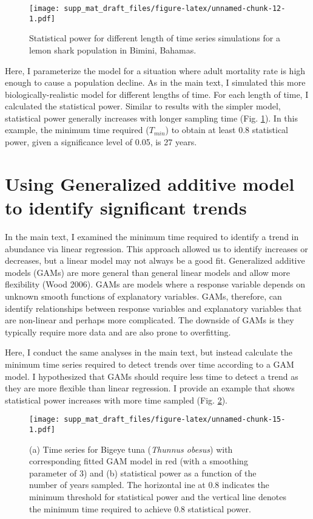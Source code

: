 \documentclass[12pt,]{article}
\begin{document}
\begin{figure}
\centering
\texttt{[image: supp\_mat\_draft\_files/figure-latex/unnamed-chunk-12-1.pdf]}
\caption{Statistical power for different length of time series
simulations for a lemon shark population in Bimini,
Bahamas.\label{fig:shark_example}}
\end{figure}

Here, I parameterize the model for a situation where adult mortality
rate is high enough to cause a population decline. As in the main text,
I simulated this more biologically-realistic model for different lengths
of time. For each length of time, I calculated the statistical power.
Similar to results with the simpler model, statistical power generally
increases with longer sampling time (Fig. \ref{fig:shark_example}). In
this example, the minimum time required (\(T_{min}\)) to obtain at least
0.8 statistical power, given a significance level of 0.05, is 27 years.

\pagebreak

\section{Using Generalized additive model to identify significant
trends}\label{using-generalized-additive-model-to-identify-significant-trends}

In the main text, I examined the minimum time required to identify a
trend in abundance via linear regression. This approach allowed us to
identify increases or decreases, but a linear model may not always be a
good fit. Generalized additive models (GAMs) are more general than
general linear models and allow more flexibility (Wood 2006). GAMs are
models where a response variable depends on unknown smooth functions of
explanatory variables. GAMs, therefore, can identify relationships
between response variables and explanatory variables that are non-linear
and perhaps more complicated. The downside of GAMs is they typically
require more data and are also prone to overfitting.

Here, I conduct the same analyses in the main text, but instead
calculate the minimum time series required to detect trends over time
according to a GAM model. I hypothesized that GAMs should require less
time to detect a trend as they are more flexible than linear regression.
I provide an example that shows statistical power increases with more
time sampled (Fig. \ref{fig:gam_example}).

\begin{figure}
\centering
\texttt{[image: supp\_mat\_draft\_files/figure-latex/unnamed-chunk-15-1.pdf]}
\caption{(a) Time series for Bigeye tuna (\emph{Thunnus obesus}) with
corresponding fitted GAM model in red (with a smoothing parameter of 3)
and (b) statistical power as a function of the number of years sampled.
The horizontal ine at 0.8 indicates the minimum threshold for
statistical power and the vertical line denotes the minimum time
required to achieve 0.8 statistical power.\label{fig:gam_example}}
\end{figure}
\end{document}
